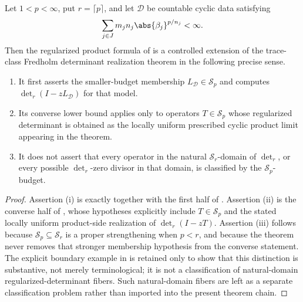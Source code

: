 \begin{corollary}
  \label{cor:regularized-controlled-extension-scope}
  Let \(1<p<\infty\), put \(r=\lceil p\rceil\), and let
  \(\mathcal D\) be countable cyclic data satisfying
  \[
    \sum_{j\in J}m_jn_j\abs{\beta_j}^{p/n_j}<\infty .
  \]
  Then the regularized product formula of
   is a controlled
  extension of the trace-class Fredholm determinant realization theorem in
  the following precise sense.
  \begin{enumerate}[label=\textup{(\roman*)}]
    \item It first asserts the smaller-budget membership
    \(L_{\mathcal D}\in\mathcal S_p\) and computes
    \(\det_r(I-zL_{\mathcal D})\) for that model.
    \item Its converse lower bound applies only to operators
    \(T\in\mathcal S_p\) whose regularized determinant is obtained as the
    locally uniform prescribed cyclic product limit appearing in the
    theorem.
    \item It does not assert that every operator in the natural
    \(\mathcal S_r\)-domain of \(\det_r\), or every possible
    \(\det_r\)-zero divisor in that domain, is classified by the
    \(\mathcal S_p\)-budget.
  \end{enumerate}
\end{corollary}

\begin{proof}
  Assertion (i) is exactly
   together with the first half
  of . Assertion (ii) is
  the converse half of
  , whose hypotheses
  explicitly include \(T\in\mathcal S_p\) and the stated locally uniform
  product-side realization of \(\det_r(I-zT)\). Assertion (iii) follows
  because \(\mathcal S_p\subseteq\mathcal S_r\) is a proper strengthening
  when \(p<r\), and because the theorem never removes that stronger
  membership hypothesis from the converse statement. The explicit
  boundary example in  is retained
  only to show that this distinction is substantive, not merely
  terminological; it is not a classification of natural-domain
  regularized-determinant fibers. Such natural-domain fibers are left as a
  separate classification problem rather than imported into the present theorem
  chain.
\end{proof}

